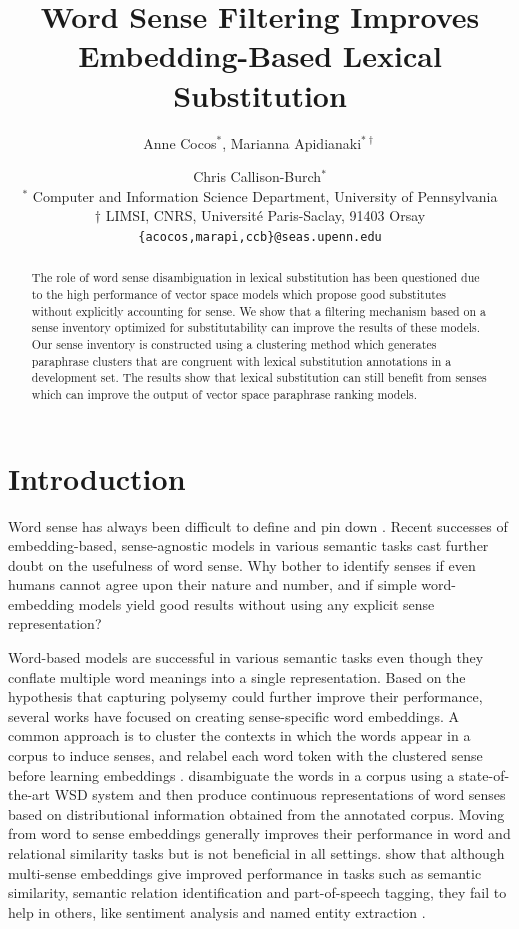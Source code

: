 \documentclass[11pt]{article}
\title{Word Sense Filtering Improves Embedding-Based Lexical Substitution}
\author{Anne Cocos$^{*}$, Marianna Apidianaki$^{*\dag}$ \and Chris Callison-Burch$^{*}$\\
	$^{*}$ Computer and Information Science Department, University of Pennsylvania \\ 
	$\dag$ LIMSI, CNRS, Universit\'e Paris-Saclay, 91403 Orsay \\
	{\tt \{acocos,marapi,ccb\}@seas.upenn.edu} \\}
\date{}
\begin{document}
	\maketitle
	\begin{abstract}
		
		The role of word sense disambiguation in lexical substitution has been questioned due to the high performance of vector space models which propose good substitutes without explicitly accounting for sense. We show that a filtering mechanism based on a sense inventory optimized for substitutability can improve the results of these models. Our sense inventory is constructed using a clustering method which generates paraphrase clusters that are congruent with lexical substitution annotations in a development set. The results show that lexical substitution can still benefit from senses which can improve the output of vector space paraphrase ranking models.
		
	\end{abstract}
	
	\section{Introduction}
	
	Word sense has always been difficult to define and pin down \cite{kilgarriff1997don,ErketalCL2013}. Recent successes of embedding-based, sense-agnostic models in various semantic tasks cast further doubt on the usefulness of word sense. Why bother to identify senses if even humans cannot agree upon their nature and number, and if simple word-embedding models yield good results without using any explicit sense representation?  
	
	Word-based models are successful in various semantic tasks even though they conflate multiple word meanings into a single representation. Based on the hypothesis that capturing polysemy could further improve their performance, several works have focused on creating sense-specific word embeddings. A common approach is to cluster the contexts in which the words appear in a corpus to induce senses, and relabel each word token with the clustered sense before learning embeddings \cite{reisinger-mooney:2010:NAACLHLT,huang-EtAl:2012:ACL20122}. 
	 disambiguate the words in a corpus using a state-of-the-art WSD system and then produce continuous representations of word senses based on distributional information obtained from the annotated corpus. 
	Moving from word to sense embeddings generally improves their performance in word and relational similarity tasks but is not beneficial in all settings. 
	 show that although multi-sense embeddings give improved performance in tasks such as semantic similarity, semantic relation identification and part-of-speech tagging, they fail to help in others, like sentiment analysis and named entity extraction \cite{li-jurafsky:2015:EMNLP}. 
	
\end{document}
